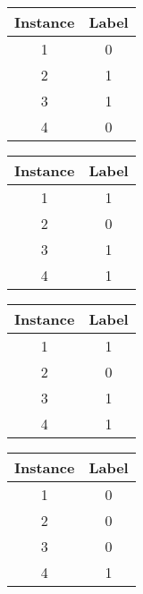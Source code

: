 \documentclass[Dissertation.tex]{subfiles}
\begin{document}
\begin{table}[]
	\begin{subfigure}{1\linewidth}
		\centering
			\begin{subfigure}{0.2\linewidth}
				\begin{tabular*}{1\linewidth}{@{}cc@{}}
					\toprule
					Instance & Label \\ \midrule
					1	&	0        \\
					2	&	1        \\
					3	&   1 	    \\
					4	&   0	    \\ \bottomrule
				\end{tabular*}
			\end{subfigure}
			\quad
			\begin{subfigure}{0.2\linewidth}
				\begin{tabular*}{1\linewidth}{@{}cc@{}}
					\toprule
					Instance & Label \\ \midrule
					1	&	1        \\
					2	&	0        \\
					3	&	1        \\
					4	&	1        \\ \bottomrule
				\end{tabular*}
			\end{subfigure}
			\quad
			\begin{subfigure}{0.2\linewidth}
				\begin{tabular*}{1\linewidth}{@{}cc@{}}
					\toprule
					Instance & Label \\ \midrule
					1	&	1        \\
					2	&	0        \\
					3	&	1        \\
					4	&	1        \\ \bottomrule
				\end{tabular*}
			\end{subfigure}
			\quad
			\begin{subfigure}{0.2\linewidth}
				\begin{tabular*}{1\linewidth}{@{}cc@{}}
					\toprule
					Instance & Label \\ \midrule
					1	&	0        \\
					2	&	0        \\
					3	&	0        \\
					4	&	1        \\ \bottomrule
				\end{tabular*}
			\end{subfigure}
		\end{subfigure}

	
	
\end{table}
\end{document}
